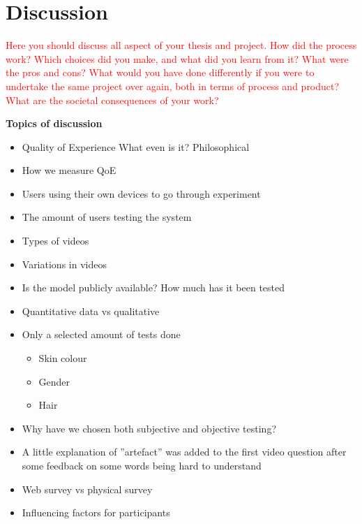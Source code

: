 \chapter{Discussion}\label{cha:discussion}
%
\textcolor{red}{Here you should discuss all aspect of your thesis and project. How did the process work? Which choices did you make, and what did you learn from it? What were the pros and cons? What would you have done differently if you were to undertake the same project over again, both in terms of process and product? What are the societal consequences of your work?}

\textbf{Topics of discussion}
\begin{itemize}
    \item Quality of Experience \newline What even is it? Philosophical
    \item How we measure QoE
    \item Users using their own devices to go through experiment
    \item The amount of users testing the system
    \item Types of videos
    \item Variations in videos
    \item Is the model publicly available? How much has it been tested
    \item Quantitative data vs qualitative
    
    \item Only a selected amount of tests done
    \begin{itemize}
        \item Skin colour
        \item Gender
        \item Hair
    \end{itemize}
    \item Why have we chosen both subjective and objective testing?
    \item A little explanation of ''artefact'' was added to the first video question after some feedback on some words being hard to understand
    \item Web survey vs physical survey
    \item Influencing factors for participants
    
\end{itemize}